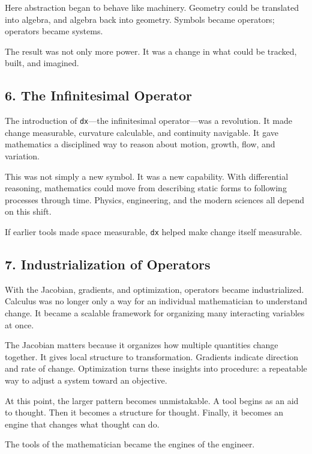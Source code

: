 Here abstraction began to behave like machinery. Geometry could be
translated into algebra, and algebra back into geometry. Symbols became
operators; operators became systems.

The result was not only more power. It was a change in what could be
tracked, built, and imagined.

\hypertarget{the-infinitesimal-operator}{%
\subsection{6. The Infinitesimal
Operator}\label{the-infinitesimal-operator}}

The introduction of \texttt{dx}---the infinitesimal operator---was a
revolution. It made change measurable, curvature calculable, and
continuity navigable. It gave mathematics a disciplined way to reason
about motion, growth, flow, and variation.

This was not simply a new symbol. It was a new capability. With
differential reasoning, mathematics could move from describing static
forms to following processes through time. Physics, engineering, and the
modern sciences all depend on this shift.

If earlier tools made space measurable, \texttt{dx} helped make change
itself measurable.

\hypertarget{industrialization-of-operators}{%
\subsection{7. Industrialization of
Operators}\label{industrialization-of-operators}}

With the Jacobian, gradients, and optimization, operators became
industrialized. Calculus was no longer only a way for an individual
mathematician to understand change. It became a scalable framework for
organizing many interacting variables at once.

The Jacobian matters because it organizes how multiple quantities change
together. It gives local structure to transformation. Gradients indicate
direction and rate of change. Optimization turns these insights into
procedure: a repeatable way to adjust a system toward an objective.

At this point, the larger pattern becomes unmistakable. A tool begins as
an aid to thought. Then it becomes a structure for thought. Finally, it
becomes an engine that changes what thought can do.

The tools of the mathematician became the engines of the engineer.

